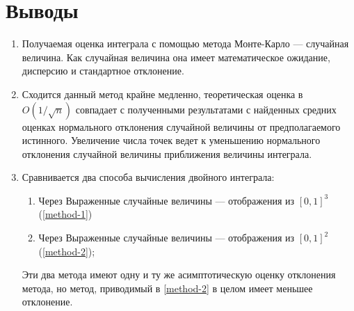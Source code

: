 \section{Выводы}
\begin{enumerate}
	\item Получаемая оценка интеграла с помощью метода Монте-Карло --- случайная величина. Как случайная величина она имеет математическое ожидание, дисперсию и стандартное отклонение.
	\item Сходится данный метод крайне медленно, теоретическая оценка в \(O(1/\sqrt{n})\) совпадает с полученными результатами с найденных средних оценках нормального отклонения случайной величины от предполагаемого истинного. Увеличение числа точек ведет к уменьшению нормального отклонения случайной величины приближения величины интеграла.
	\item Сравнивается два способа вычисления двойного интеграла:
	      \begin{enumerate}
		      \item Через Выраженные случайные величины --- отображения из \([0,1]^3\) (\cref{method-1})
		      \item Через Выраженные случайные величины --- отображения из \([0,1]^2\) (\cref{method-2});
	      \end{enumerate}
	      Эти два метода имеют одну и ту же асимптотическую оценку отклонения метода, но метод, приводимый в \cref{method-2} в целом имеет меньшее отклонение.
\end{enumerate}
